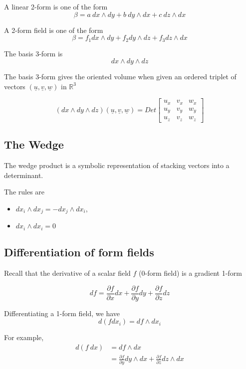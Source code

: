 A linear 2-form is one of the form
\[
  \beta = a\ dx \wedge dy + b\ dy \wedge dx + c\ dz \wedge dx
\] 

A 2-form field is one of the form
\[
  \beta = f_1 dx \wedge dy + f_2 dy \wedge dz + f_3 dz \wedge dx
\] 


The basis 3-form is 
\[
  dx \wedge dy \wedge dz
\] 

The basis 3-form gives the oriented volume when given an ordered triplet of vectors $ \left( \underline{u}, \underline{v}, \underline{w} \right) $ in $ \mathbb{R}^3$

\[
   \left( dx \wedge dy \wedge dz \right) \left(  \underline{u},  \underline{v}, \underline{w} \right)  = Det \begin{bmatrix} 
      u_x & v_x & w_x \\  
      u_y & v_y & w_y \\  
      u_z & v_z & w_z
   \end{bmatrix}
\] 


\subsection{The Wedge}

The wedge product is a symbolic representation of stacking vectors into a determinant. 

The rules are
\begin{itemize}
   \item $ dx_i \wedge dx_j = - dx_j \wedge dx_i$, 
   \item $ dx_i \wedge dx_i = 0$
\end{itemize}

\subsection{Differentiation of form fields}

Recall that the derivative of a scalar field $f$ (0-form field) is a gradient 1-form

\[
  df = \frac{\partial f}{\partial x} dx + \frac{\partial f}{\partial y}dy + \frac{\partial f}{\partial z}dz
\] 

Differentiating a 1-form field, we have
\[
  d(f dx_i) = df \wedge dx_i
\] 

For example,
\begin{align*}
   d(f\ dx) &= df \wedge dx \\
            &= \frac{\partial f}{\partial y} dy \wedge dx + \frac{\partial f}{\partial z} dz \wedge dx
\end{align*}

